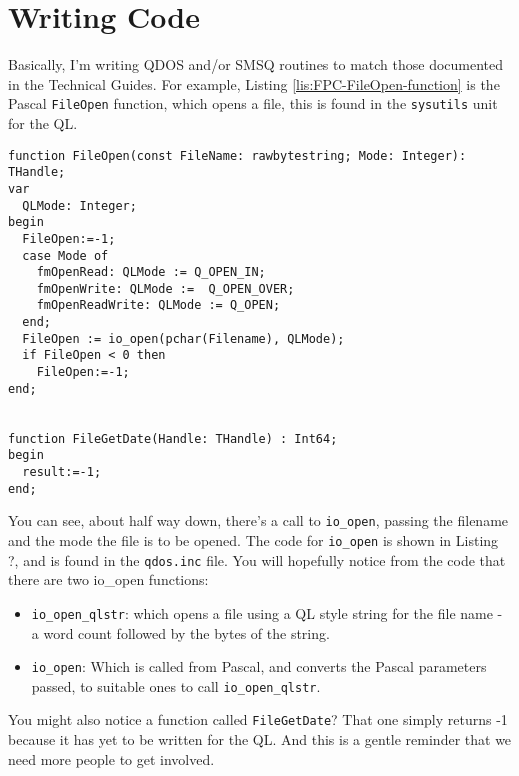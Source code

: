 \section{Writing Code}

Basically, I'm writing QDOS and/or SMSQ routines to match those documented
in the Technical Guides. For example, Listing \ref{lis:FPC-FileOpen-function}
is the Pascal \texttt{FileOpen} function, which opens a file, this
is found in the \texttt{sysutils} unit for the QL.

\begin{lstlisting}[caption={FPC FileOpen function},label={lis:FPC-FileOpen-function}]
function FileOpen(const FileName: rawbytestring; Mode: Integer): THandle;
var
  QLMode: Integer;
begin
  FileOpen:=-1;
  case Mode of
    fmOpenRead: QLMode := Q_OPEN_IN;
    fmOpenWrite: QLMode :=  Q_OPEN_OVER;
    fmOpenReadWrite: QLMode := Q_OPEN;
  end;
  FileOpen := io_open(pchar(Filename), QLMode);
  if FileOpen < 0 then
    FileOpen:=-1;
end;


function FileGetDate(Handle: THandle) : Int64;
begin
  result:=-1;
end;

\end{lstlisting}

You can see, about half way down, there's a call to \texttt{io\_open},
passing the filename and the mode the file is to be opened. The code
for \texttt{io\_open} is shown in Listing ?, and is found in the \texttt{qdos.inc}
file. You will hopefully notice from the code that there are two io\_open
functions:
\begin{itemize}
\item \texttt{io\_open\_qlstr}: which opens a file using a QL style string
for the file name - a word count followed by the bytes of the string.
\item \texttt{io\_open}: Which is called from Pascal, and converts the Pascal
parameters passed, to suitable ones to call \texttt{io\_open\_qlstr}.
\end{itemize}
You might also notice a function called \texttt{FileGetDate}? That
one simply returns -1 because it has yet to be written for the QL.
And this is a gentle reminder that we need more people to get involved.

